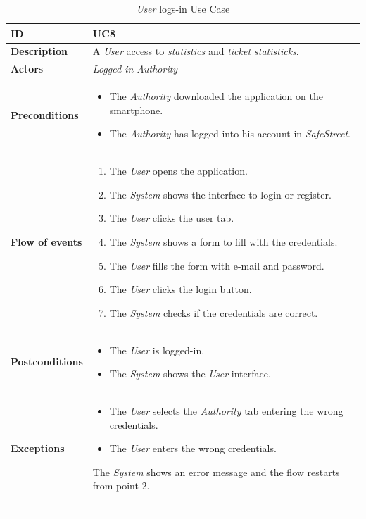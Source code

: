\documentclass {article}
\begin{document}
	\begin{longtable}{| p{3 cm} | p{10.5 cm} |} 
			\hline
			{\bf ID} & UC8 \\
			\hline
			{\bf Description} & A {\it User} access to {\it statistics} and {\it ticket statisticks}.\\
			\hline
			{\bf Actors} & {\it Logged-in Authority}\\
			\hline
			{\bf Preconditions} & 	
			\begin{itemize}
				\item The {\it Authority} downloaded the application on the smartphone.
				\item The {\it Authority} has logged into his account in {\it SafeStreet}.
			\end{itemize}
			\\
			\hline
			{\bf Flow of events} &	
			\begin{enumerate}
				\item The {\it User} opens the application.
				\item The {\it System} shows the interface to login or register.
				\item The {\it User} clicks the user tab.
				\item The {\it System} shows a form to fill with the credentials.
				\item The {\it User} fills the form with e-mail and password. 
				\item The {\it User} clicks the login button.
				\item The {\it System} checks if the credentials are correct. 
			\end{enumerate}
			\\
			\hline
			{\bf Postconditions} & 
			\begin{itemize}
				\item The {\it User} is logged-in.
				\item The {\it System} shows the {\it User} interface.
			\end{itemize}
			\\
			\hline
			{\bf Exceptions} & 	
			\begin{itemize}
				\item The {\it User} selects the {\it Authority} tab entering the wrong credentials. 
				\item The {\it User} enters the wrong credentials.
			\end{itemize}
			The {\it System} shows an error message and the flow restarts from point 2.
			\\ \\
			\hline
			\caption{{\it User} logs-in Use Case}
			\end{longtable}
			
\end{document}
